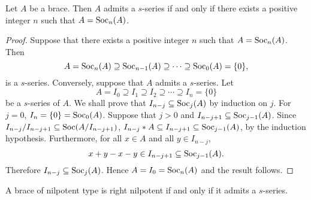 \begin{lemma}
\label{lem:socn}
Let $A$ be a brace. Then $A$ admits a
$s$-series if and only if there exists a positive integer $n$ such
that $A=\operatorname{Soc}_n(A)$.
\end{lemma}

\begin{proof}
    Suppose that there exists a positive integer $n$ such
that $A=\operatorname{Soc}_n(A)$. Then 
\[
A=\operatorname{Soc}_n(A)\supseteq
\operatorname{Soc}_{n-1}(A)\supseteq\cdots\supseteq \operatorname{Soc}_0(A)=\{0\},
\] is a
$s$-series. Conversely, suppose that $A$ admits a $s$-series.
Let 
\[
A=I_0\supseteq I_1\supseteq I_2\supseteq\cdots\supseteq I_n=\{0\}
\]
be a $s$-series of $A$. We shall prove that $I_{n-j}\subseteq
\operatorname{Soc}_{j}(A)$ by induction on $j$. For $j=0$, $I_n=\{0\}=\operatorname{Soc}_0(A)$.
Suppose that $j>0$ and $I_{n-j+1}\subseteq \operatorname{Soc}_{j-1}(A)$. Since
$I_{n-j}/I_{n-j+1}\subseteq \operatorname{Soc}(A/I_{n-j+1})$, $I_{n-j}*A\subseteq
I_{n-j+1}\subseteq \operatorname{Soc}_{j-1}(A)$, by the induction hypothesis.
Furthermore, for all $x\in A$ and all $y\in I_{n-j}$, 
\[
x+y-x-y\in
I_{n-j+1}\subseteq \operatorname{Soc}_{j-1}(A).
\]
Therefore
$I_{n-j}\subseteq\operatorname{Soc}_j(A)$. Hence $A=I_0=\operatorname{Soc}_n(A)$ and the result
follows.
\end{proof}


\begin{proposition}
    \label{pro:right_nilpotent}
    A brace of nilpotent type is right nilpotent if and only if it admits a $s$-series.
\end{proposition}

